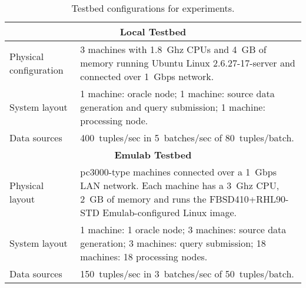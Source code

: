 
\begin{table}[b!]
  \centering
  \renewcommand{\arraystretch}{1.5}
  \begin{tabular}{|m{3cm}|p{12cm}|} 
  \hline
  \multicolumn{2}{|c|}{\bf Local Testbed} \\ 
  
    \hline\hline
	Physical configuration
	& 
	3 machines with 1.8~Ghz CPUs and 4~GB of memory running Ubuntu Linux 2.6.27-17-server and connected
	over 1~Gbps network. \\
    \hline
	
	System layout
	&
	1 machine: oracle node; 1 machine: source data generation and query submission; 1 machine: \sys
	processing node. \\
    \hline
	
	Data sources
	&
	400~tuples/sec in 5~batches/sec of 80~tuples/batch. 
	\\
    \hline\hline
    
    \multicolumn{2}{|c|}{\bf Emulab Testbed} \\ 
    \hline\hline
	Physical layout
	&	
	pc3000-type machines connected over a 1~Gbps LAN network. Each machine has a 3~Ghz CPU, 2~GB of
	memory and runs the FBSD410+RHL90-STD Emulab-configured Linux image.
	\\
    \hline
	System layout
	&
	1 machine: 1 oracle node;
	3 machines: source data generation; 
	3 machines: query submission;
	18 machines: 18 \sys processing nodes. \\
    \hline
	
	Data sources
	& 
	150~tuples/sec in 3~batches/sec of 50~tuples/batch. \\
	
    \hline\hline 
  \end{tabular}
  \caption{Testbed configurations for experiments. }
  \label{table:machines}
\end{table}
